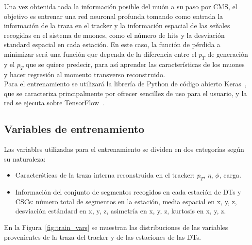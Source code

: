 
Una vez obtenida toda la informaci\'on posible del mu\'on a su paso por CMS, el objetivo es entrenar una red neuronal profunda tomando como entrada la informaci\'on de la traza en el tracker y la informaci\'on espacial de las se\~nales recogidas en el sistema de muones, como el n\'umero de hits y la desviaci\'on standard espacial en cada estaci\'on. En este caso, la funci\'on de p\'erdida a minimizar ser\'a  una funci\'on que dependa de la diferencia entre el $p_{T}$ de generaci\'on y el $p_{T}$ que se quiere predecir, para as\'i aprender las caracter\'isticas de los muones y hacer regresi\'on al momento transverso reconstruido. \\

Para el entrenamiento se utilizar\'a la librer\'ia de Python de c\'odigo abierto Keras~\cite{chollet2015keras}, que se caracteriza principalmente por ofrecer sencillez de uso para el usuario, y la red se ejecuta sobre TensorFlow~\cite{tensorflow2015-whitepaper}.


\subsection{Variables de entrenamiento}\label{sec:variables}

Las variables utilizadas para el entrenamiento se dividen en dos categor\'ias seg\'un su naturaleza:

\begin{itemize}
\item Caracter\'sticas de la traza interna reconstruida en el tracker: $p_{T}$, $\eta$, $\phi$, carga.
\item Informaci\'on del conjunto de segmentos recogidos en cada estaci\'on de DTs y CSCs: n\'umero total de segmentos en la estaci\'on, media espacial en x, y, z, desviaci\'on est\'andard en x, y, z, asimetr\'ia en x, y, z, kurtosis en x, y, z.
\end{itemize}

En la Figura~\ref{fig:train_vars} se muestran las distribuciones de las variables provenientes de la traza del tracker y de las estaciones de las DTs.

